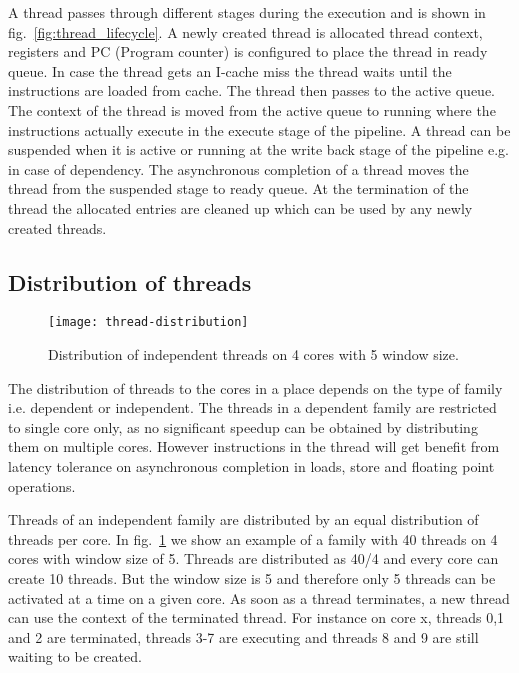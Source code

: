 \documentclass{article}
\begin{document}
A thread passes through different stages during the execution and is shown
in fig.~\ref{fig:thread_lifecycle}. A newly created thread is allocated thread
context, registers and PC (Program counter) is configured to place the thread
in ready queue. In case the thread gets an I-cache miss the thread waits
until the instructions are loaded from cache. The thread then passes to the
active queue. The context of the thread is moved from the active queue to
running where the instructions actually execute in the execute stage of the
pipeline. A thread can be suspended when it is active or running at the write
back stage of the pipeline e.g. in case of dependency. The asynchronous
completion of a thread moves the thread from the suspended stage to ready
queue. At the termination of the thread the allocated entries are cleaned up
which can be used by any newly created threads.

\subsection{Distribution of threads}

\begin{figure}
\begin{centering}
\label{Neighborhood}
    \texttt{[image: thread-distribution]}
    \caption{\label{fig:thread_distribution}Distribution of independent threads on 4 cores with 5 window size.}
\end{centering}
\end{figure}

The distribution of threads to the cores in a place depends on the type of
family i.e. dependent or independent. The threads in a dependent family are
restricted to single core only, as no significant speedup can be obtained by
distributing them on multiple cores. However instructions in the thread will
get benefit from latency tolerance on asynchronous completion in loads, store
and floating point operations.

Threads of an independent family are distributed by an equal distribution of
threads per core. In fig.~\ref{fig:thread_distribution} we show an example of a
family with 40 threads on 4 cores with window size of 5. Threads are
distributed as 40/4 and every core can create 10 threads. But the window size
is 5 and therefore only 5 threads can be activated at a time on a given core.
As soon as a thread terminates, a new thread can use the context of the
terminated thread. For instance on core x, threads 0,1 and 2 are terminated,
threads 3-7 are executing and threads 8 and 9 are still waiting to be
created.
\end{document}
